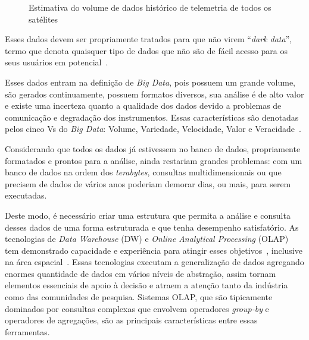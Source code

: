 {\begin{figure}[!hb]
	\caption{Estimativa do volume de dados histórico de telemetria de todos os satélites}\label{fig:totaldatagen}
	\vspace{4mm}
	\begin{center}
	\end{center}
	\vspace{2mm}
\end{figure}

Esses dados devem ser propriamente tratados para que não virem ``\textit{dark data}'', termo que denota quaisquer tipo de dados que não são de fácil acesso para os seus usuários em potencial~\cite{heidornSheddingLightDark2008}.

Esses dados entram na definição de \textit{Big Data}, pois possuem um grande volume, são gerados continuamente, possuem formatos diversos, sua análise é de alto valor e existe uma incerteza quanto a qualidade dos dados devido a problemas de comunicação e degradação dos instrumentos.
Essas características são denotadas pelos cinco Vs do \textit{Big Data}: Volume, Variedade, Velocidade, Valor e Veracidade~\cite{kacfahemaniUnderstandableBigData2015}.

Considerando que todos os dados já estivessem no banco de dados, propriamente formatados e prontos para a análise, ainda restariam grandes problemas: com um banco de dados na ordem dos \textit{terabytes}, consultas multidimensionais ou que precisem de dados de vários anos poderiam demorar dias, ou mais, para serem executadas.

}

Deste modo, é necessário criar uma estrutura que permita a análise e consulta desses dados de uma forma estruturada e que tenha desempenho satisfatório.
As tecnologias de \textit{Data Warehouse} (DW) e \textit{Online Analytical Processing} (OLAP) tem demonstrado capacidade e experiência para atingir esses objetivos~\cite{bimonteOpenIssuesBig2016}, inclusive na área espacial~\cite{yvernesCopernicusGroundSegment2018}.
Essas tecnologias executam a generalização de dados agregando enormes quantidade de dados em vários níveis de abstração, assim tornam elementos essenciais de apoio à decisão e atraem a atenção tanto da indústria como das comunidades de pesquisa.
Sistemas OLAP, que são tipicamente dominados por consultas complexas que envolvem operadores \textit{group-by} e operadores de agregações, são as principais características entre essas ferramentas.

